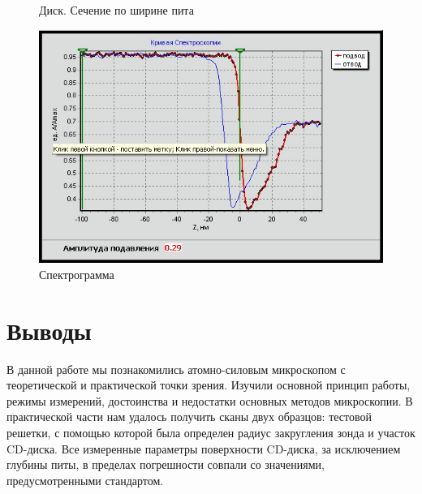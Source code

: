 \documentclass[a4paper,12pt]{article}
\theoremstyle{plain} %
\theoremstyle{definition} %
\theoremstyle{remark} %
\begin{document}
\begin{itemize}
\begin{enumerate}
\begin{figure}[h!]
	\caption{Диск. Сечение по ширине пита}
	\label{pшс}
\end{figure}
\begin{figure}[h!]
	\centering
	\includegraphics[scale=1]{fin.jpg}
	\caption{Спектрограмма}
	\label{pшс}
\end{figure}


	
\end{enumerate}
\section{Выводы}
В данной работе мы познакомились атомно-силовым микроскопом с теоретической и практической точки зрения. Изучили основной принцип работы, режимы измерений, достоинства и недостатки основных методов микроскопии. В практической части нам удалось получить сканы двух образцов: тестовой решетки, с помощью которой была определен радиус закругления зонда и участок CD-диска. Все измеренные параметры поверхности CD-диска, за исключением глубины питы, в пределах погрешности совпали со значениями, предусмотренными стандартом.



         

 


\end{itemize}








	
\end{document}
